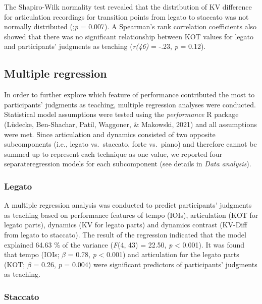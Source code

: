 \documentclass[
  man,floatsintext]{apa6}
\begin{document}
The Shapiro-Wilk normality test revealed that the distribution of KV difference for articulation recordings for transition points from legato to staccato was not normally distributed (;\emph{p} = 0.007). A Spearman's rank correlation coefficients also showed that there was no significant relationship between KOT values for legato and participants' judgments as teaching (\emph{r(46)} = -.23, \emph{p} = 0.12).

\hypertarget{multiple-regression}{%
\subsection{Multiple regression}\label{multiple-regression}}

In order to further explore which feature of performance contributed the most to participants' judgments as teaching, multiple regression analyses were conducted. Statistical model assumptions were tested using the \emph{performance} R package (Lüdecke, Ben-Shachar, Patil, Waggoner, \& Makowski, 2021) and all assumptions were met. Since articulation and dynamics consisted of two opposite subcomponents (i.e., legato vs.~staccato, forte vs.~piano) and therefore cannot be summed up to represent each technique as one value, we reported four separateregression models for each subcomponent (see details in \emph{Data analysis}).

\hypertarget{legato}{%
\subsubsection{Legato}\label{legato}}

A multiple regression analysis was conducted to predict participants' judgments as teaching based on performance features of tempo (IOIs), articulation (KOT for legato parts), dynamics (KV for legato parts) and dynamics contrast (KV-Diff from legato to staccato). The result of the regression indicated that the model explained 64.63 \% of the variance (\emph{F}(4, 43) = 22.50, \emph{p} \textless{} 0.001). It was found that tempo (IOIs; \emph{\(\beta\)} = 0.78, \emph{p} \textless{} 0.001) and articulation for the legato parts (KOT; \emph{\(\beta\)} = 0.26, \emph{p} = 0.004) were significant predictors of participants' judgments as teaching.

\hypertarget{staccato}{%
\subsubsection{Staccato}\label{staccato}}
\end{document}

